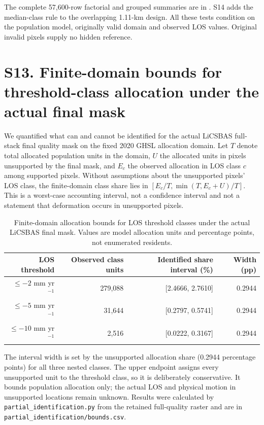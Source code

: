 \documentclass[10pt,a4paper]{article}
\begin{document}
The complete 57,600-row factorial and grouped summaries are in . S14 adds the median-class rule to the overlapping 1.11-km design. All these tests condition on the population model, originally valid domain and observed LOS values. Original invalid pixels supply no hidden reference.




\section*{S13. Finite-domain bounds for threshold-class allocation under the actual final mask}

We quantified what can and cannot be identified for the actual LiCSBAS full-stack final quality mask on the fixed 2020 GHSL allocation domain. Let $T$ denote total allocated population units in the domain, $U$ the allocated units in pixels unsupported by the final mask, and $E_c$ the observed allocation in LOS class $c$ among supported pixels. Without assumptions about the unsupported pixels' LOS class, the finite-domain class share lies in $[E_c/T,\min(T,E_c+U)/T]$. This is a worst-case accounting interval, not a confidence interval and not a statement that deformation occurs in unsupported pixels.

\begin{table}[htbp]\centering\small
\caption{Finite-domain allocation bounds for LOS threshold classes under the actual LiCSBAS final mask. Values are model allocation units and percentage points, not enumerated residents.}
\begin{tabular}{rrrr}\toprule
LOS threshold & Observed class units & Identified share interval (\%) & Width (pp) \\\midrule
$\leq-2$ mm yr$^{-1}$ & 279,088 & [2.4666, 2.7610] & 0.2944 \\
$\leq-5$ mm yr$^{-1}$ & 31,644 & [0.2797, 0.5741] & 0.2944 \\
$\leq-10$ mm yr$^{-1}$ & 2,516 & [0.0222, 0.3167] & 0.2944 \\
\bottomrule\end{tabular}
\end{table}

The interval width is set by the unsupported allocation share (0.2944 percentage points) for all three nested classes. The upper endpoint assigns every unsupported unit to the threshold class, so it is deliberately conservative. It bounds population allocation only; the actual LOS and physical motion in unsupported locations remain unknown. Results were calculated by \texttt{partial\_identification.py} from the retained full-quality raster and are in \texttt{partial\_identification/bounds.csv}.
\end{document}
